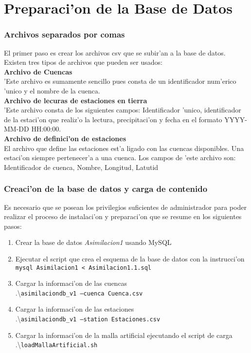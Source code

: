 \section{Preparaci'on de la Base de Datos}
\subsubsection*{Archivos separados por comas}
El primer paso es crear los archivos csv que se subir'an a la base de datos. Existen tres tipos de archivos que pueden ser usados: \\

\textbf{Archivo de Cuencas} \\
'Este archivo es sumamente sencillo pues consta de un identificador num'erico 'unico y el nombre de la cuenca. \\

\textbf{Archivo de lecuras de estaciones en tierra}  \\
'Este archivo consta de los siguientes campos: Identificador 'unico, identificador de la estaci'on que realiz'o la lectura, precipitaci'on
y fecha en el formato YYYY-MM-DD HH:00:00. \\

\textbf{Archivo de definici'on de estaciones} \\
El archivo que define las estaciones est'a ligado con las cuencas disponibles. Una estaci'on siempre pertenecer'a a una cuenca.
Los campos de 'este archivo son: Identificador de cuenca, Nombre, Longitud, Latutid

\subsubsection*{Creaci'on de la base de datos y carga de contenido}
Es necesario que se posean los privilegios suficientes de administrador para poder realizar el 
proceso de instalaci'on y preparaci'on que se resume en los siguientes pasos:

\begin{enumerate}
 \item Crear la base de datos \textit{Asimilacion1} usando MySQL
  \item Ejecutar el script que crea el esquema de la base de datos con la instrucci'on \\ \texttt{mysql Asimilacion1 < Asimilacion1.1.sql}
  \item Cargar la informaci'on de las cuencas \\ .\textbackslash\texttt{asimilaciondb\_v1 --cuenca Cuenca.csv}
  \item Cargar la informaci'on de las estaciones \\ .\textbackslash\texttt{asimilaciondb\_v1  --station Estaciones.csv }
  \item Cargar la informaci'on de la malla artificial ejecutando el script de carga \\ .\textbackslash\texttt{loadMallaArtificial.sh}
\end{enumerate}


